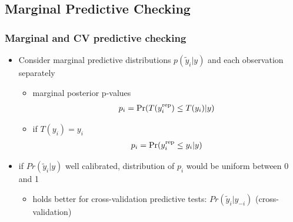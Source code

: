 \documentclass[10pt]{beamer}
\begin{document}
\subsection{Marginal Predictive Checking}
\frame{\subsectionpage}


\begin{frame}[fragile]

\frametitle{Marginal and CV predictive checking}

  \begin{itemize}
  \item Consider marginal predictive distributions $p(\tilde{y}_i|y)$
    and each observation separately
    \begin{itemize}
    \item marginal posterior p-values
      \begin{align*}
        p_i = \mbox{Pr}(T(y_i^{\operatorname{\mathrm{rep}}}) \leq T(y_i) | y)
      \end{align*}
      \pause
    \item<2-> if $T(y_i)=y_i$
      \begin{align*}
        p_i = \mbox{Pr}(y_i^{\operatorname{\mathrm{rep}}} \leq y_i | y)
      \end{align*}
    \end{itemize}
  \item<2-> if $Pr(\tilde{y}_i|y)$ well calibrated, distribution of $p_i$
    would be uniform between 0 and 1
    \begin{itemize}
    \item holds better for cross-validation predictive tests: $Pr(\tilde{y}_i|y_{-i})$
      (cross-validation)
    \end{itemize}
  \end{itemize}

\end{frame}
\end{document}
